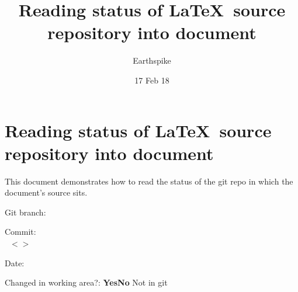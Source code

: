 \documentclass[a4paper]{article}
\title{Reading status of \LaTeX\ source repository into document}
\author{Earthspike}
\date{17 Feb 18}
\begin{document}
\begin{titlepage}
\maketitle
\end{titlepage}


\section{Reading status of \LaTeX\ source repository into document}

This document demonstrates how to read the status of the git repo in which the document's source sits.

\ifingit Git branch: {\bf\gitbranch}\par
Commit: {\bf\lastgitcommitref\\
  \lastgitcommitname\ $<$\lastgitcommitemail$>$}\par
Date: {\bf\lastgitcommitdate}\par
Changed in working area?: {\bf\ifchangedsincegitcommit Yes\else No\fi}
\else
Not in git
\fi\par
\end{document}
